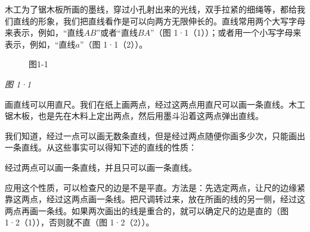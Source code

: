 木工为了锯木板所画的墨线，穿过小孔射出来的光线，双手拉紧的细绳等，都给我们直线的形象，我们把直线看作是可以向两方无限伸长的。直线常用两个大写字母来表示，例如，``直线\(AB\)''或者``直线\(BA\)''（图
1·1（1））；或者用一个小写字母来表示，例如，``直线\(a\)''（图
1·1（2））。

\begin{figure}
\centering
\caption{图1-1}
\end{figure}

\emph{图 1·1}

画直线可以用直尺。我们在纸上画两点，经过这两点用直尺可以画一条直线。木工锯木板，也是先在木料上定出两点，然后用墨斗沿着这两点弹出直线。

我们知道，经过一点可以画无数条直线，但是经过两点随便你画多少次，只能画出一条直线。从这些事实可以得知下述的直线的性质：

经过两点可以画一条直线，并且只可以画一条直线。

应用这个性质，可以检查尺的边是不是平直。方法是：先选定两点，让尺的边缘紧靠这两点，经过这两点画一条线。把尺调转过来，放在所画的线的另一侧，经过这两点再画一条线。如果两次画出的线是重合的，就可以确定尺的边是直的（图
1·2（1）），否则就不直（图 1·2（2））。

